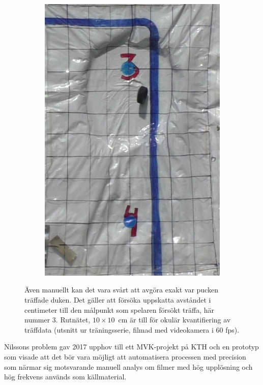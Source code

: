\documentclass[a4paper,12pt]{article}
\begin{document}
\begin{figure}[ht]
\begin{subfigure}[t]{0.24\textwidth}
    \includegraphics[width=\linewidth]{photos/skott4.png}
  \end{subfigure}%

  \caption{Även manuellt kan det vara svårt att avgöra exakt var pucken
    träffade duken. Det gäller att försöka uppskatta avståndet i centimeter
    till den målpunkt som spelaren försökt träffa, här nummer 3. Rutnätet,
    $10 \times 10$~cm är till för okulär kvantifiering av träffdata (utsnitt
    ur träningsserie, filmad med videokamera i 60 fps).\label{fig:skott}}
\end{figure}

Nilssons problem gav 2017 upphov till ett MVK-projekt på KTH och en
prototyp som visade att det bör vara möjligt att automatisera processen med
precision som närmar sig motsvarande manuell analys om filmer med hög
upplösning och hög frekvens används som källmaterial.
\end{document}
